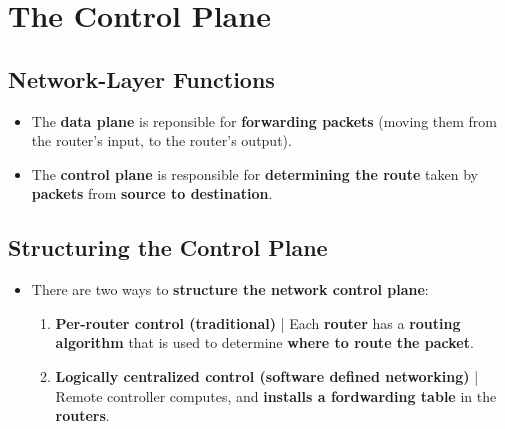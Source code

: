 \documentclass{article}
\begin{document}
    \section*{The Control Plane}

    \subsection*{Network-Layer Functions}
    \begin{itemize}
        \item The \textbf{data plane} is reponsible for \textbf{forwarding packets} (moving them from the router's input, to the router's output).
        \item The \textbf{control plane} is responsible for \textbf{determining the route} taken by \textbf{packets} from \textbf{source to destination}. 
    \end{itemize}

    \subsection*{Structuring the Control Plane}
    \begin{itemize}
        \item There are two ways to \textbf{structure the network control plane}:
        \begin{enumerate}
            \item \textbf{Per-router control (traditional)} | Each \textbf{router} has a \textbf{routing algorithm} that is used to determine \textbf{where to route the packet}.
            \item \textbf{Logically centralized control (software defined networking)} | Remote controller computes, and \textbf{installs a fordwarding table} in the \textbf{routers}.
        \end{enumerate}
    \end{itemize}

    \section*{}
    
\end{document}
